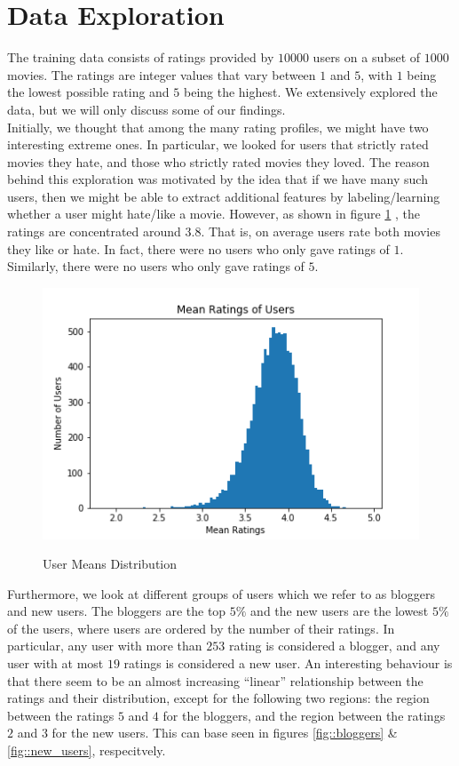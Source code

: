 \documentclass[10pt,conference,compsocconf]{IEEEtran}
\begin{document}
\section{Data Exploration}
The training data consists of ratings provided by $10000$ users on a subset of $1000$ movies. The ratings are integer values that vary between $1$ and $5$, with $1$ being the lowest possible rating and $5$ being the highest. We extensively explored the data, but we will only discuss some of our findings.\\
Initially, we thought that among the many rating profiles, we might have two interesting extreme ones. In particular, we looked for users that strictly rated movies they hate, and those who strictly rated movies they loved. The reason behind this exploration was motivated by the idea that if we have many such users, then we might be able to extract additional features by labeling/learning whether a user might hate/like a movie. However, as shown in figure \ref{fig::users_means} , the ratings are concentrated around $3.8$. That is, on average users rate both movies they like or hate. In fact, there were no users who only gave ratings of $1$. Similarly, there were no users who only gave ratings of $5$. \\
\begin{figure}[h!]
    \caption{User Means Distribution}
    \centering
    \includegraphics[width=0.8\columnwidth]{figure1.png}
    \label{fig::users_means}
\end{figure}
Furthermore, we look at different groups of users which we refer to as bloggers and new users. The bloggers are the top $5\%$ and the new users are the lowest $5\%$ of the users, where users are ordered by the number of their ratings. 
In particular, any user with more than $253$ rating is considered a blogger, and any user with at most $19$ ratings is considered a new user. An interesting behaviour is that there seem to be an almost increasing ``linear'' relationship between the ratings and their distribution, except for the following two regions: the region between the ratings $5$ and $4$ for the bloggers, and the region between the ratings $2$ and $3$ for the new users. This can base seen in figures \ref{fig::bloggers} \& \ref{fig::new_users}, respecitvely.
\end{document}
